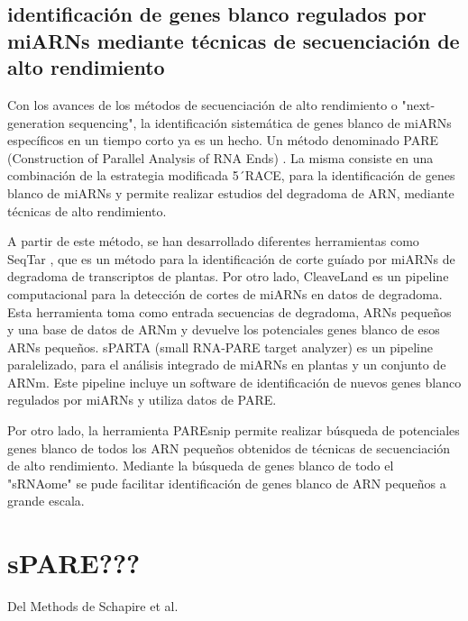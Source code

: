 \subsection{identificación de genes blanco regulados por miARNs mediante técnicas de secuenciación de alto rendimiento}
Con los avances de los métodos de secuenciación de alto rendimiento o "next-generation sequencing", la identificación sistemática de genes blanco de miARNs específicos en un tiempo corto ya es un hecho.
Un método denominado PARE (Construction of Parallel Analysis of RNA Ends) \citep{pmid19247285}.
La misma consiste en una combinación de la estrategia modificada 5´RACE, para la identificación de genes blanco de miARNs y permite realizar estudios del degradoma de ARN, mediante técnicas de alto rendimiento.

A partir de este método, se han desarrollado diferentes herramientas como SeqTar \citep{pmid22140118}, que es un método para la identificación de corte guíado por miARNs de degradoma de transcriptos de plantas.
Por otro lado, CleaveLand \citep{pmid19017659} es un pipeline computacional para la detección de cortes de miARNs en datos de degradoma.
Esta herramienta toma como entrada secuencias de degradoma, ARNs pequeños y una base de datos de ARNm y devuelve los potenciales genes blanco de esos ARNs pequeños. 
sPARTA (small RNA-PARE target analyzer) \citep{pmid25120269} es un pipeline paralelizado, para el análisis integrado de miARNs en plantas y un conjunto de ARNm.
Este pipeline incluye un software de identificación de nuevos genes blanco regulados por miARNs y utiliza datos de PARE.

Por otro lado, la herramienta PAREsnip permite realizar búsqueda de potenciales genes blanco de todos los ARN pequeños obtenidos de técnicas de secuenciación de alto rendimiento.
Mediante la búsqueda de genes blanco de todo el "sRNAome" se pude facilitar identificación de genes blanco de ARN pequeños a grande escala.

\section{sPARE???}
Del Methods de Schapire et al.
